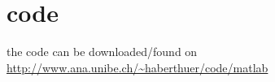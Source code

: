 \section{code}
the code can be downloaded/found on \url{http://www.ana.unibe.ch/~haberthuer/code/matlab}